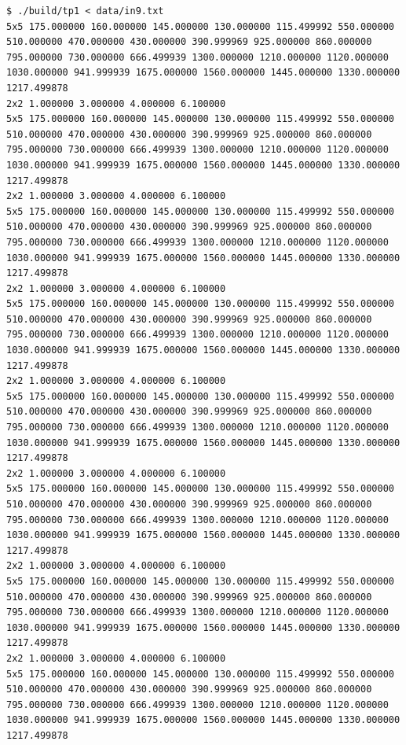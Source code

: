 \documentclass[a4paper,10pt]{article}
\begin{document}
\begin{lstlisting}
$ ./build/tp1 < data/in9.txt
5x5 175.000000 160.000000 145.000000 130.000000 115.499992 550.000000 510.000000 470.000000 430.000000 390.999969 925.000000 860.000000 795.000000 730.000000 666.499939 1300.000000 1210.000000 1120.000000 1030.000000 941.999939 1675.000000 1560.000000 1445.000000 1330.000000 1217.499878 
2x2 1.000000 3.000000 4.000000 6.100000 
5x5 175.000000 160.000000 145.000000 130.000000 115.499992 550.000000 510.000000 470.000000 430.000000 390.999969 925.000000 860.000000 795.000000 730.000000 666.499939 1300.000000 1210.000000 1120.000000 1030.000000 941.999939 1675.000000 1560.000000 1445.000000 1330.000000 1217.499878 
2x2 1.000000 3.000000 4.000000 6.100000 
5x5 175.000000 160.000000 145.000000 130.000000 115.499992 550.000000 510.000000 470.000000 430.000000 390.999969 925.000000 860.000000 795.000000 730.000000 666.499939 1300.000000 1210.000000 1120.000000 1030.000000 941.999939 1675.000000 1560.000000 1445.000000 1330.000000 1217.499878 
2x2 1.000000 3.000000 4.000000 6.100000 
5x5 175.000000 160.000000 145.000000 130.000000 115.499992 550.000000 510.000000 470.000000 430.000000 390.999969 925.000000 860.000000 795.000000 730.000000 666.499939 1300.000000 1210.000000 1120.000000 1030.000000 941.999939 1675.000000 1560.000000 1445.000000 1330.000000 1217.499878 
2x2 1.000000 3.000000 4.000000 6.100000 
5x5 175.000000 160.000000 145.000000 130.000000 115.499992 550.000000 510.000000 470.000000 430.000000 390.999969 925.000000 860.000000 795.000000 730.000000 666.499939 1300.000000 1210.000000 1120.000000 1030.000000 941.999939 1675.000000 1560.000000 1445.000000 1330.000000 1217.499878 
2x2 1.000000 3.000000 4.000000 6.100000 
5x5 175.000000 160.000000 145.000000 130.000000 115.499992 550.000000 510.000000 470.000000 430.000000 390.999969 925.000000 860.000000 795.000000 730.000000 666.499939 1300.000000 1210.000000 1120.000000 1030.000000 941.999939 1675.000000 1560.000000 1445.000000 1330.000000 1217.499878 
2x2 1.000000 3.000000 4.000000 6.100000 
5x5 175.000000 160.000000 145.000000 130.000000 115.499992 550.000000 510.000000 470.000000 430.000000 390.999969 925.000000 860.000000 795.000000 730.000000 666.499939 1300.000000 1210.000000 1120.000000 1030.000000 941.999939 1675.000000 1560.000000 1445.000000 1330.000000 1217.499878 
2x2 1.000000 3.000000 4.000000 6.100000 
5x5 175.000000 160.000000 145.000000 130.000000 115.499992 550.000000 510.000000 470.000000 430.000000 390.999969 925.000000 860.000000 795.000000 730.000000 666.499939 1300.000000 1210.000000 1120.000000 1030.000000 941.999939 1675.000000 1560.000000 1445.000000 1330.000000 1217.499878 

\end{lstlisting}
\end{document}
